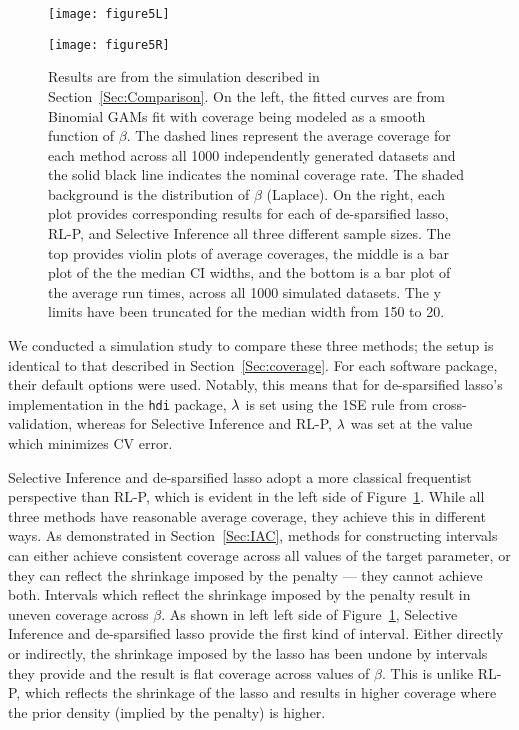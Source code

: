 \begin{figure}[htb!]
  \begin{center}
    \begin{minipage}[t]{0.34\linewidth}
      \centering
      \texttt{[image: figure5L]}
    \end{minipage}
    \hfill
    \begin{minipage}[t]{0.64\linewidth}
      \centering
      \texttt{[image: figure5R]}
    \end{minipage}
    \caption{\label{fig:5} Results are from the simulation described in Section~\ref{Sec:Comparison}. On the left, the fitted curves are from Binomial GAMs fit with coverage being modeled as a smooth function of $\beta$. The dashed lines represent the average coverage for each method across all 1000 independently generated datasets and the solid black line indicates the nominal coverage rate. The shaded background is the distribution of $\beta$ (Laplace). On the right, each plot provides corresponding results for each of de-sparsified lasso, RL-P, and Selective Inference all three different sample sizes. The top provides violin plots of average coverages, the middle is a bar plot of the the median CI widths, and the bottom is a bar plot of the average run times, across all 1000 simulated datasets. The y limits have been truncated for the median width from 150 to 20.}
  \end{center}
\end{figure}

We conducted a simulation study to compare these three methods; the setup is identical to that described in Section~\ref{Sec:coverage}. For each software package, their default options were used. Notably, this means that for de-sparsified lasso's implementation in the \texttt{hdi} package, $\lambda$ is set using the 1SE rule from cross-validation, whereas for Selective Inference and RL-P, $\lambda$ was set at the value which minimizes CV error.

Selective Inference and de-sparsified lasso adopt a more classical frequentist perspective than RL-P, which is evident in the left side of Figure~\ref{fig:5}. While all three methods have reasonable average coverage, they achieve this in different ways. As demonstrated in Section~\ref{Sec:IAC}, methods for constructing intervals can either achieve consistent coverage across all values of the target parameter, or they can reflect the shrinkage imposed by the penalty --- they cannot achieve both. Intervals which reflect the shrinkage imposed by the penalty result in uneven coverage across $\beta$. As shown in left left side of Figure~\ref{fig:5}, Selective Inference and de-sparsified lasso provide the first kind of interval. Either directly or indirectly, the shrinkage imposed by the lasso has been undone by intervals they provide and the result is flat coverage across values of $\beta$. This is unlike RL-P, which reflects the shrinkage of the lasso and results in higher coverage where the prior density (implied by the penalty) is higher.

